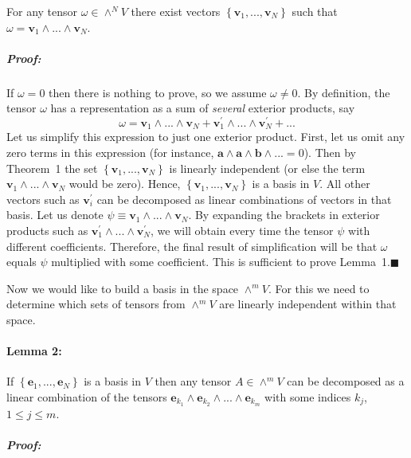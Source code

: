 For any tensor $\omega\in\wedge^{N}V$ there exist vectors $\left\{ \mathbf{v}_{1},...,\mathbf{v}_{N}\right\} $
such that $\omega=\mathbf{v}_{1}\wedge...\wedge\mathbf{v}_{N}$.


\subparagraph{Proof:}

If $\omega=0$ then there is nothing to prove, so we assume $\omega\neq0$.
By definition, the tensor $\omega$ has a representation as a sum
of \emph{several} exterior products, say \[
\omega=\mathbf{v}_{1}\wedge...\wedge\mathbf{v}_{N}+\mathbf{v}_{1}^{\prime}\wedge...\wedge\mathbf{v}_{N}^{\prime}+...\]
Let us simplify this expression to just one exterior product. First,
let us omit any zero terms in this expression (for instance, $\mathbf{a}\wedge\mathbf{a}\wedge\mathbf{b}\wedge...=0$).
Then by Theorem~1 the set $\left\{ \mathbf{v}_{1},...,\mathbf{v}_{N}\right\} $
is linearly independent (or else the term $\mathbf{v}_{1}\wedge...\wedge\mathbf{v}_{N}$
would be zero). Hence, $\left\{ \mathbf{v}_{1},...,\mathbf{v}_{N}\right\} $
is a basis in $V$. All other vectors such as $\mathbf{v}_{i}^{\prime}$
can be decomposed as linear combinations of vectors in that basis.
Let us denote $\psi\equiv\mathbf{v}_{1}\wedge...\wedge\mathbf{v}_{N}$.
By expanding the brackets in exterior products such as $\mathbf{v}_{1}^{\prime}\wedge...\wedge\mathbf{v}_{N}^{\prime}$,
we will obtain every time the tensor $\psi$ with different coefficients.
Therefore, the final result of simplification will be that $\omega$
equals  $\psi$ multiplied with some coefficient. This is sufficient
to prove Lemma~1.\hfill{}$\blacksquare$

Now we would like to build a basis in the space $\wedge^{m}V$. For
this we need to determine which sets of tensors from $\wedge^{m}V$
are linearly independent within that space.


\paragraph{Lemma 2:}

If $\left\{ \mathbf{e}_{1},...,\mathbf{e}_{N}\right\} $ is a basis
in $V$ then any tensor $A\in\wedge^{m}V$ can be decomposed as a
linear combination of the tensors $\mathbf{e}_{k_{1}}\wedge\mathbf{e}_{k_{2}}\wedge...\wedge\mathbf{e}_{k_{m}}$
with some indices $k_{j}$, $1\leq j\leq m$.


\subparagraph{Proof:}

